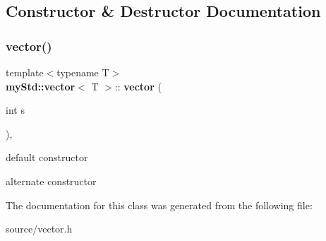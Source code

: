 \subsection{Constructor \& Destructor Documentation}
\mbox{\label{classmy_std_1_1vector_a3f942029ffea510e3c6e67310c18abb7}} 
\subsubsection{vector()}
{\footnotesize\ttfamily template$<$typename T$>$ \\
\textbf{ my\+Std\+::vector}$<$ T $>$\+::\textbf{ vector} (\begin{DoxyParamCaption}\item[{int}]{s }\end{DoxyParamCaption})\hspace{0.3cm}{\ttfamily [inline]}, {\ttfamily [explicit]}}



default constructor 

alternate constructor 

The documentation for this class was generated from the following file\+:\begin{DoxyCompactItemize}
\item 
source/vector.\+h\end{DoxyCompactItemize}
